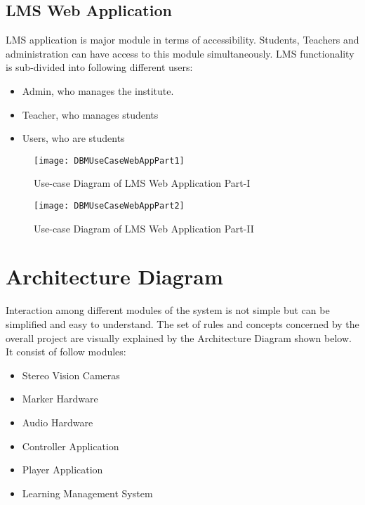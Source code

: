\newpage
\subsection{LMS Web Application}
LMS application is major module in terms of accessibility. Students, Teachers and administration can have access to this module simultaneously. LMS functionality is sub-divided into following different users:

\begin{itemize}

\item Admin, who manages the institute.
\item Teacher, who manages students
\item Users, who are students


\end{itemize}

\bigskip

\begin{figure}[h]
  \centering
  \texttt{[image: DBMUseCaseWebAppPart1]}
  \caption{Use-case Diagram of LMS Web Application Part-I}
\end{figure}

\begin{figure}[h]
  \centering
  \texttt{[image: DBMUseCaseWebAppPart2]}
  \caption{Use-case Diagram of LMS Web Application Part-II}
\end{figure}

\bigskip
\bigskip
\section{Architecture Diagram}
Interaction among different modules of the system is not simple but can be simplified and easy to understand. The set of rules and concepts concerned by the overall project are visually explained by the Architecture Diagram shown below.
It consist of follow modules:
\begin{itemize}

\item Stereo Vision Cameras
\item Marker Hardware
\item Audio Hardware
\item Controller Application
\item Player Application
\item Learning Management System

\end{itemize}
\bigskip
\bigskip

